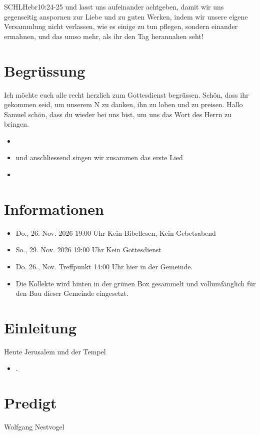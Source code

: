 \documentclass[fontsize=16pt]{mybib}
\author{OTS}
\newcommand{\Name}{Samuel}
\begin{document}
\begin{bibelbox}{SCHL}{Hebr}{10:24-25}
    und lasst uns aufeinander achtgeben, damit wir uns gegenseitig anspornen zur Liebe und zu guten Werken, indem wir unsere eigene Versammlung nicht verlassen, wie es einige zu tun pflegen, sondern einander ermahnen, und das umso mehr, als ihr den Tag herannahen seht!
\end{bibelbox}
\section{Begrüssung}
Ich möchte euch alle recht herzlich zum Gottesdienst begrüssen. Schön, dass ihr gekommen seid, um unserem \herr N zu danken, ihn zu loben und zu preisen. 
Hallo \Name{} schön, dass du wieder bei uns bist, um uns das Wort des Herrn zu bringen.

\begin{itemize}
    \item {}
    \item und anschliessend singen wir zusammen das erste Lied
    \item {}
\end{itemize}

\section{Informationen}
\begin{itemize}  
    \item {} Do., 26. Nov. 2026 19:00 Uhr Kein Bibellesen, Kein Gebetsabend
    \item {} So., 29. Nov. 2026 19:00 Uhr Kein Gottesdienst
    \item {} Do. 26., Nov. Treffpunkt 14:00 Uhr hier in der Gemeinde.
    \item {} Die Kollekte wird hinten in der grünen Box gesammelt und vollumfänglich für den Bau dieser Gemeinde eingesetzt.
\end{itemize}
\section{Einleitung}
Heute Jerusalem und der Tempel
\begin{itemize}
    \item {}.
\end{itemize}
\section{Predigt}
    Wolfgang Nestvogel
\end{document}
